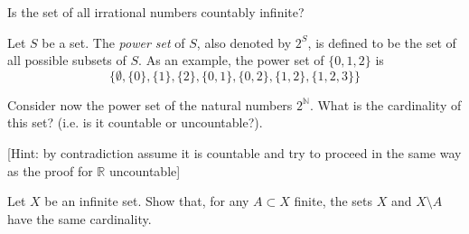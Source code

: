 \documentclass[11pt]{article}%
\begin{document}
\begin{Exercise}[title=*]
	Is the set of all irrational numbers countably infinite?
\end{Exercise}

\begin{Exercise}[title=**$\dagger$]
	Let $S$ be a set. The \textit{power set} of $S$, also denoted by $2^{S}$, is defined to be the set of all possible subsets of $S$. As an example, the power set of $\{0,1,2\}$ is $$\{\emptyset,\{0\},\{1\},\{2\},\{0,1\},\{0,2\},\{1,2\},\{1,2,3\}\}$$
	
	Consider now the power set of the natural numbers $2^\mathbb N$. What is the cardinality of this set? (i.e. is it countable or uncountable?).
	
	\bigskip
	
	[Hint: by contradiction assume it is countable and try to proceed in the same way as the proof for $\mathbb R$ uncountable]
\end{Exercise}

\begin{Exercise}[title=**]
	Let $X$ be an infinite set. Show that, for any $A\subset X$ finite, the sets $X$ and $X\setminus A$ have the same cardinality. 
\end{Exercise}
\end{document}
